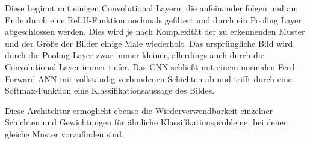 Diese beginnt mit einigen Convolutional Layern, die aufeinander folgen und am Ende durch eine ReLU-Funktion nochmals gefiltert und durch ein Pooling Layer abgeschlossen werden. Dies wird je nach Komplexität der zu erkennenden Muster und der Größe der Bilder einige Male wiederholt. Das ursprüngliche Bild wird durch die Pooling Layer zwar immer kleiner, allerdings auch durch die Convolutional Layer immer tiefer. Das CNN schließt mit einem normalen Feed-Forward ANN mit vollständig verbundenen Schichten ab und trifft durch eine Softmax-Funktion eine Klassifikationsaussage des Bildes. \cite[S. 371]{AurelienGeron.2018}

Diese Architektur ermöglicht ebenso die Wiederverwendbarkeit einzelner Schichten und Gewichtungen für ähnliche Klassifikationsprobleme, bei denen gleiche Muster vorzufinden sind. \cite[S. 271]{AurelienGeron.2018}
